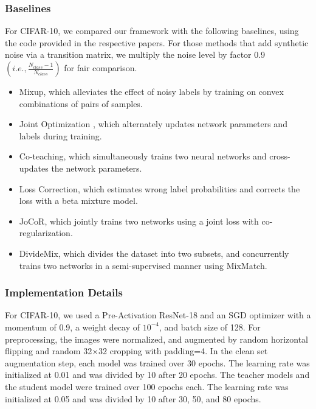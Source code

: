 \documentclass[conference]{IEEEtran}
\begin{document}
\subsubsection{Baselines}
For CIFAR-10, we compared our framework with the following baselines, using the code provided in the respective papers. For those methods that add synthetic noise via a transition matrix, we multiply the noise level by factor 0.9 $(i.e., \frac{N_{class}-1}{N_{class}})$ for fair comparison. 
\begin{itemize}
    \item Mixup\cite{zhang2017mixup}, which alleviates the effect of noisy labels by training on convex combinations of pairs of samples.
    \item Joint Optimization \cite{tanaka2018joint}, which alternately updates network parameters and labels during training.
    \item Co-teaching\cite{han2018co}, which simultaneously trains two neural networks and cross-updates the network parameters. \item Loss Correction\cite{arazo2019unsupervised}, which estimates wrong label probabilities and corrects the loss with a beta mixture model. \item JoCoR\cite{wei2020combating}, which jointly trains two networks using a joint loss with co-regularization.
    \item DivideMix\cite{li2020dividemix}, which divides the dataset into two subsets, and concurrently trains two networks in a semi-supervised manner using MixMatch.
\end{itemize}

\subsubsection{Implementation Details}
For CIFAR-10, we used a Pre-Activation ResNet-18 \cite{he2016identity} and an SGD optimizer with a momentum of 0.9, a weight decay of $10^{-4}$, and batch size of 128. For preprocessing, the images were normalized, and augmented by random horizontal flipping and random 32$\times$32 cropping with padding=4. In the clean set augmentation step, each model was trained over 30 epochs. The learning rate was initialized at 0.01 and was divided by 10 after 20 epochs. The teacher models and the student model were trained over 100 epochs each. The learning rate was initialized at 0.05 and was divided by 10 after 30, 50, and 80 epochs.
\end{document}
